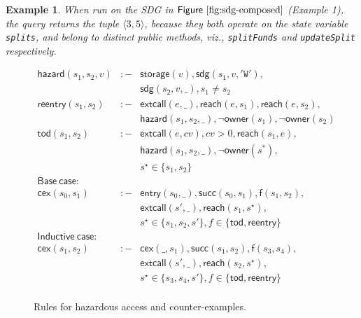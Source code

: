 \documentclass[conference, romanappendices]{tex/IEEEtran}
\theoremstyle{bfnote}
\newcommand{\viz}{\textit{viz.}}
\newcommand{\Fig}[1]{\ensuremath{\sf Figure~\ref{#1}}}
\newtheorem{example}{Example}
\begin{document}
\vspace{-2mm}
\noindent
\begin{example}
When run on the {SDG\EndAccSupp{}} in \Fig{fig:sdg-composed} (Example 1), the query returns the tuple $\langle 3, 5 \rangle$, because they both operate on the state variable \texttt{splits}, and belong to distinct public methods, \viz, \texttt{splitFunds} and \texttt{updateSplit} respectively.
\end{example}

\begin{figure}[t]
	\vspace{-2mm}
	\small
	\[\begin{array}{rlll}
	\mathsf{hazard}(s_1, s_2, v) & :- & \mathsf{storage}(v), \mathsf{sdg}(s_{\mathsf{1}}, v, \mathtt{'W'}),\\
	& &\mathsf{sdg}(s_{\mathsf{2}}, v, \_), s_1\neq s_2 \\
	
	\mathsf{reentry}(s_{\mathsf{1}}, s_{\mathsf{2}}) & :- & \mathsf{extcall}(e, \_), \mathsf{reach}(e, s_1), \mathsf{reach}(e, s_2),  \\
	& & \mathsf{hazard}(s_1, s_2, \_), \neg \mathsf{owner}(s_1), \neg \mathsf{owner}(s_2)\\
	
	\mathsf{tod}(s_{\mathsf{1}}, s_{\mathsf{2}}) & :- & \mathsf{extcall}(e, cv), cv > 0, \mathsf{reach}(s_1, e),\\ 
	& & \mathsf{hazard}(s_1, s_2, \_), \neg \mathsf{owner}(s^*),\\ 
	& & s^{\star}\in \{s_1, s_2\} \\
	
	\mathsf{Base \ case:} \\
	\mathsf{cex}(s_0, s_1) & :- & \mathsf{entry}(s_0, \_), \mathsf{succ}(s_0, s_1), \mathsf{f}(s_1,s_2), \\ 
	& &\mathsf{extcall}(s',\_), \mathsf{reach}(s_1, s^{\star}), \\
	& & s^{\star}\in \{s_1,s_2,s'\}, f \in \{\mathsf{tod,reentry}\}\\
	\mathsf{Inductive \ case:} \\
	\mathsf{cex}(s_1, s_2) & :- & \mathsf{cex}(\_, s_1), \mathsf{succ}(s_1, s_2), \mathsf{f}(s_3,s_4), \\ 
	& &\mathsf{extcall}(s',\_),\mathsf{reach}(s_2, s^{\star}),\\ 
	& & s^{\star} \in \{s_3,s_4,s'\}, f \in \{\mathsf{tod,reentry}\}\\
	\end{array}\]
	\vspace{-4mm}
	\caption{\small Rules for hazardous access and counter-examples.}
	\label{fig:ce-rule}
	\vspace{-6mm}
\end{figure}
\end{document}
